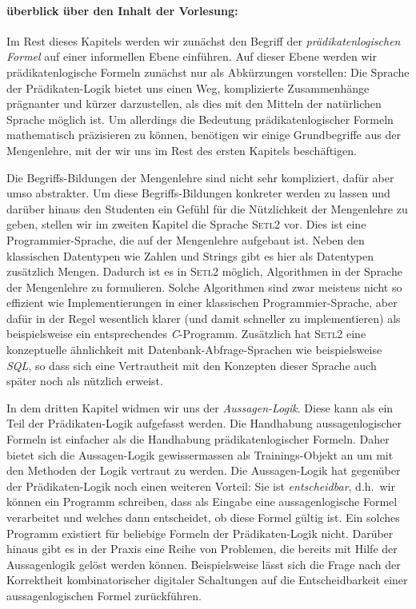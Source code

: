 \paragraph{\"{u}berblick \"{u}ber den Inhalt der Vorlesung:} 
Im Rest dieses Kapitels werden wir zun\"{a}chst den Begriff der 
\emph{pr\"{a}dikatenlogischen Formel} auf einer informellen Ebene einf\"{u}hren.  Auf dieser Ebene
werden wir pr\"{a}dikatenlogische Formeln zun\"{a}chst nur als Abk\"{u}rzungen vorstellen:
Die Sprache der Pr\"{a}dikaten-Logik bietet uns einen Weg, komplizierte
Zusammenh\"{a}nge pr\"{a}gnanter und k\"{u}rzer darzustellen, als dies mit den Mitteln der nat\"{u}rlichen
Sprache m\"{o}glich ist.  Um allerdings die Bedeutung pr\"{a}dikatenlogischer Formeln 
mathematisch pr\"{a}zisieren zu k\"{o}nnen, ben\"{o}tigen wir einige Grundbegriffe aus der
Mengenlehre, mit der wir uns im Rest des ersten Kapitels besch\"{a}ftigen.

Die Begriffs-Bildungen der Mengenlehre sind nicht sehr kompliziert, daf\"{u}r aber umso
abstrakter.  Um diese Begriffs-Bildungen konkreter werden zu lassen und dar\"{u}ber hinaus den
Studenten ein Gef\"{u}hl f\"{u}r die N\"{u}tzlichkeit der Mengenlehre zu geben, stellen wir im zweiten
Kapitel die Sprache \textsc{Setl2} vor.  Dies ist eine Programmier-Sprache, die auf der
Mengenlehre aufgebaut ist.  Neben den klassischen Datentypen wie Zahlen und Strings gibt
es hier als Datentypen zus\"{a}tzlich Mengen.  Dadurch ist es in \textsc{Setl2} m\"{o}glich,
Algorithmen in der Sprache der Mengenlehre zu formulieren.  Solche Algorithmen sind zwar
meistens nicht so effizient wie Implementierungen in einer klassischen
Programmier-Sprache, aber daf\"{u}r in der Regel wesentlich klarer (und damit schneller zu
implementieren) als beispielsweise ein entsprechendes \textsl{C}-Programm.  
Zus\"{a}tzlich hat
\textsc{Setl2} eine konzeptuelle \"{a}hnlichkeit mit Datenbank-Abfrage-Sprachen wie
beispielsweise \textsl{SQL}, so dass sich eine Vertrautheit mit den Konzepten dieser
Sprache auch sp\"{a}ter noch als n\"{u}tzlich erweist.

In dem dritten Kapitel widmen wir uns der \emph{Aussagen-Logik}.  Diese kann als ein Teil der
Pr\"{a}dikaten-Logik aufgefasst werden. Die Handhabung aussagenlogischer Formeln ist einfacher als die
Handhabung pr\"{a}dikatenlogischer Formeln.  Daher bietet sich die Aussagen-Logik gewissermassen als
Trainings-Objekt an um mit den Methoden der Logik vertraut zu werden.  Die Aussagen-Logik hat
gegen\"{u}ber der Pr\"{a}dikaten-Logik noch einen weiteren Vorteil: Sie ist \emph{entscheidbar}, d.h.~wir
k\"{o}nnen ein Programm schreiben, dass als Eingabe eine aussagenlogische Formel verarbeitet und welches
dann entscheidet, ob diese Formel g\"{u}ltig ist.  Ein solches Programm existiert f\"{u}r beliebige Formeln
der Pr\"{a}dikaten-Logik nicht.  Dar\"{u}ber hinaus gibt es in der Praxis eine Reihe von Problemen, die
bereits mit Hilfe der Aussagenlogik gel\"{o}st werden k\"{o}nnen.  Beispielsweise l\"{a}sst sich die Frage nach der
Korrektheit kombinatorischer digitaler Schaltungen auf die Entscheidbarkeit einer aussagenlogischen
Formel zur\"{u}ckf\"{u}hren.

